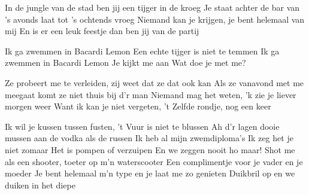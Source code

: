 \begin{verse*}
In de jungle van de stad ben jij een tijger in de kroeg
Je staat achter de bar van 's avonds laat tot 's ochtends vroeg
Niemand kan je krijgen, je bent helemaal van mij
En is er een leuk feestje dan ben jij van de partij
\end{verse*}

\begin{chorus}
Ik ga zwemmen in Bacardi Lemon
Een echte tijger is niet te temmen
Ik ga zwemmen in Bacardi Lemon
Je kijkt me aan
Wat doe je met me?
\end{chorus}

\begin{verse*}
Ze probeert me te verleiden, zij weet dat ze dat ook kan
Als ze vanavond met me meegaat komt ze niet thuis bij d'r man
Niemand mag het weten, 'k zie je liever morgen weer
Want ik kan je niet vergeten, 't Zelfde rondje, nog een keer
\end{verse*}

\thechorus

\begin{verse*}
Ik wil je kussen tussen fusten, 't Vuur is niet te blussen
Ah d'r lagen dooie mussen aan de vodka als de russen
Ik heb al mijn zwemdiploma's
Ik zeg het je niet zomaar
Het is pompen of verzuipen
En we zeggen nooit ho maar!
Shot me als een shooter, toeter op m'n waterscooter
Een complimentje voor je vader en je moeder
Je bent helemaal m'n type en je laat me zo genieten
Duikbril op en we duiken in het diepe
\end{verse*}

\thechorus[2]
